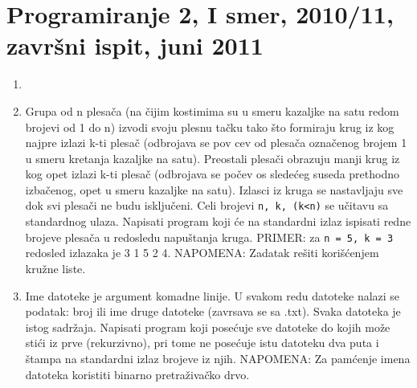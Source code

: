 \section{Programiranje 2, I smer, 2010/11, zavr\v{s}ni ispit, juni 2011}


\begin{enumerate}
\item {}

\item Grupa od n plesa\v ca (na \v cijim kostimima su u smeru kazaljke na satu redom brojevi od 1 do n) izvodi svoju plesnu ta\v cku tako \v sto
      formiraju krug iz kog najpre izlazi k-ti plesa\v c (odbrojava se pov cev od plesa\v ca ozna\v cenog brojem 1 u smeru kretanja kazaljke na satu).
      Preostali plesa\v ci obrazuju manji krug iz kog opet izlazi k-ti plesa\v c (odbrojava se po\v cev os slede\' ceg suseda prethodno izba\v cenog,
      opet u smeru kazaljke na satu). Izlasci iz kruga se nastavljaju sve dok svi plesa\v ci ne budu isklju\v ceni. Celi brojevi \verb|n, k, (k<n)| se
      u\v citavu sa standardnog ulaza. Napisati program koji \' ce na standardni izlaz ispisati redne brojeve plesa\v ca u redosledu napu\v stanja kruga.
      PRIMER: za \verb|n = 5, k = 3| redosled izlazaka je 3 1 5 2 4. NAPOMENA: Zadatak re\v siti kori\v s\' cenjem kru\v zne liste.

\item Ime datoteke je argument komadne linije. U svakom redu datoteke nalazi se podatak: broj ili ime druge datoteke (zavrsava se sa .txt). Svaka
      datoteka je istog sadr\v zaja. Napisati program koji pose\' cuje sve datoteke do kojih mo\v ze sti\' ci iz prve (rekurzivno), pri tome ne
      pose\' cuje istu datoteku dva puta i \v stampa na standardni izlaz brojeve iz njih. NAPOMENA: Za pam\' cenje imena datoteka koristiti
      binarno pretra\v ziva\v cko drvo.

\end{enumerate}


